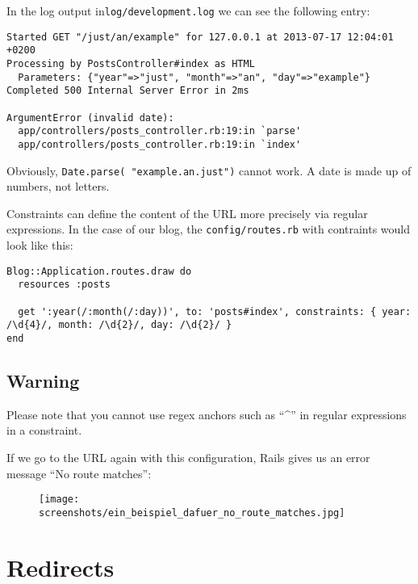 \documentclass[a4paper]{book}
\begin{document}
In the log output in\texttt{log/development.log} we can see the following entry:

\begin{shaded}\begin{verbatim}
Started GET "/just/an/example" for 127.0.0.1 at 2013-07-17 12:04:01 +0200
Processing by PostsController#index as HTML
  Parameters: {"year"=>"just", "month"=>"an", "day"=>"example"}
Completed 500 Internal Server Error in 2ms

ArgumentError (invalid date):
  app/controllers/posts_controller.rb:19:in `parse'
  app/controllers/posts_controller.rb:19:in `index'
\end{verbatim}\end{shaded}

Obviously, \texttt{Date.parse( "example.an.just")} cannot work. A date is made up of numbers, not letters.

Constraints can define the content of the URL more precisely via regular expressions. In the case of our blog, the \texttt{config/routes.rb} with contraints would look like this:

\begin{shaded}\begin{verbatim}
Blog::Application.routes.draw do
  resources :posts

  get ':year(/:month(/:day))', to: 'posts#index', constraints: { year: /\d{4}/, month: /\d{2}/, day: /\d{2}/ }
end
\end{verbatim}\end{shaded}

\subsection{Warning}\label{warning-10}

Please note that you cannot use regex anchors such as “\^{}” in regular expressions in a constraint.

If we go to the URL again with this configuration, Rails gives us an error message “No route matches”:

\begin{figure}[htbp]
\centering
\texttt{[image: screenshots/ein\_beispiel\_dafuer\_no\_route\_matches.jpg]}
\end{figure}

\section{Redirects}\label{redirects-1}
\end{document}
